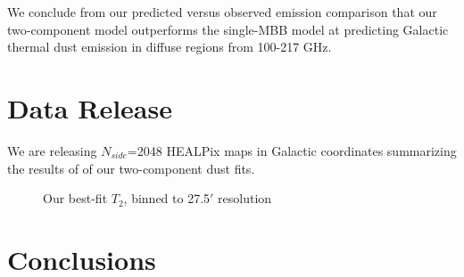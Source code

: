 \documentclass{emulateapj}
\begin{document}
We conclude from our predicted versus observed emission comparison that our 
two-component model outperforms the \cite{planckdust} single-MBB model at 
predicting Galactic thermal dust emission in diffuse regions from 100-217 GHz. 





\section{Data Release}
\label{sec:release}
We are releasing $N_{side}$=2048 HEALPix maps in Galactic coordinates 
summarizing the results of of our two-component dust fits.




\begin{figure*} [ht]
\begin{center}
\caption{\label{fig:results} Our best-fit $T_2$, binned to 27.5$'$ resolution}
\end{center}
\end{figure*}

\section{Conclusions}
\label{sec:conclusion}
\end{document}
